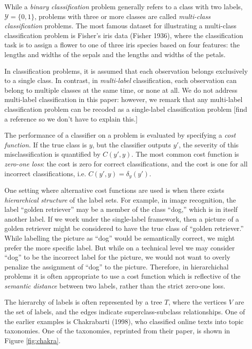 \documentclass[12pt]{article}
\begin{document}
While a \emph{binary classification} problem generally refers to a
class with two labels, $\mathcal{Y} = \{0, 1\}$, problems with three
or more classes are called \emph{multi-class classification} problems.
The most famous dataset for illustrating a multi-class classification
problem is Fisher's iris data (Fisher 1936), where the classification
task is to assign a flower to one of three iris species based on four
features: the lengths and widths of the sepals and the lengths and
widths of the petals.

In classification problems, it is assumed that each observation
belongs exclusively to a single class.  In contrast,
in \emph{multi-label} classification, each observation can belong to
multiple classes at the same time, or none at all.  We do not address
multi-label classification in this paper: however, we remark that any
multi-label classification problem can be recoded as a single-label
classification problem [find a reference so we don't have to explain
this.]

The performance of a classifier on a problem is evaluated by
specifying a \emph{cost function.}  If the true class is $y$, but the
classifier outputs $y'$, the severity of this misclassification is
quantified by $C(y', y)$.  The most common cost function
is \emph{zero-one loss}: the cost is zero for correct classifications,
and the cost is one for all incorrect classifications, i.e. $C(y', y)
= \delta_{y}(y').$

One setting where alternative cost functions are used is when there
exists \emph{hierarchical structure} of the label sets.  For example,
in image recognition, the label ``golden retriever'' may be a member
of the class ``dog,'' which is in itself another label.  If we work
under the single-label framework, then a picture of a golden retriever
might be considered to have the true class of ``golden retriever.''
While labelling the picture as ``dog'' would be semantically correct,
we might prefer the more specific label.  But while on a technical
level we may consider ``dog'' to be the incorrect label for the
picture, we would not want to overly penalize the assignment of
``dog'' to the picture.  Therefore, in hierarchichal problems it is
often appropriate to use a cost function which is reflective of
the \emph{semantic distance} between two labels, rather than the
strict zero-one loss.

The hierarchy of labels is often represented by a tree $T$, where the
vertices $V$ are the set of labels, and the edges indicate
superclass-subclass relationships.  One of the earlier examples is
Chakrabarti (1998), who classified online texts into topic taxonomies.
One of the taxonomies, reprinted from their paper, is shown in
Figure \ref{fig:chakra}.
\end{document}
